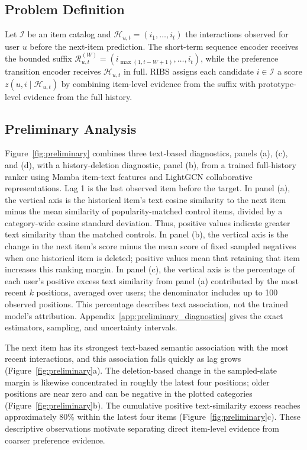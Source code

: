 \documentclass[11pt]{article}
\begin{document}
\subsection{Problem Definition}
Let $\mathcal I$ be an item catalog and $\mathcal H_{u,t}=(i_1,\ldots,i_t)$ the interactions observed for user $u$ before the next-item prediction. The short-term sequence encoder receives the bounded suffix $\mathcal R_{u,t}^{(W)}=(i_{\max(1,t-W+1)},\ldots,i_t)$, while the preference transition encoder receives $\mathcal H_{u,t}$ in full. RIBS assigns each candidate $i\in\mathcal I$ a score $z(u,i\mid\mathcal H_{u,t})$ by combining item-level evidence from the suffix with prototype-level evidence from the full history.

\subsection{Preliminary Analysis}
\label{sec:preliminary}

Figure~\ref{fig:preliminary} combines three text-based diagnostics, panels (a), (c), and (d), with a history-deletion diagnostic, panel (b), from a trained full-history ranker using Mamba item-text features and LightGCN collaborative representations. Lag 1 is the last observed item before the target. In panel (a), the vertical axis is the historical item's text cosine similarity to the next item minus the mean similarity of popularity-matched control items, divided by a category-wide cosine standard deviation. Thus, positive values indicate greater text similarity than the matched controls. In panel (b), the vertical axis is the change in the next item's score minus the mean score of fixed sampled negatives when one historical item is deleted; positive values mean that retaining that item increases this ranking margin. In panel (c), the vertical axis is the percentage of each user's positive excess text similarity from panel (a) contributed by the most recent $k$ positions, averaged over users; the denominator includes up to 100 observed positions. This percentage describes text association, not the trained model's attribution. Appendix~\ref{app:preliminary_diagnostics} gives the exact estimators, sampling, and uncertainty intervals.

The next item has its strongest text-based semantic association with the most recent interactions, and this association falls quickly as lag grows (Figure~\ref{fig:preliminary}a). The deletion-based change in the sampled-slate margin is likewise concentrated in roughly the latest four positions; older positions are near zero and can be negative in the plotted categories (Figure~\ref{fig:preliminary}b). The cumulative positive text-similarity excess reaches approximately 80\% within the latest four items (Figure~\ref{fig:preliminary}c). These descriptive observations motivate separating direct item-level evidence from coarser preference evidence.
\end{document}
